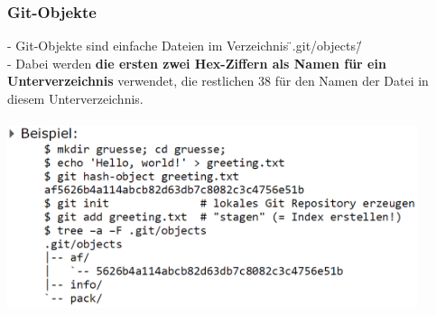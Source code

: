 \subsubsection{Git-Objekte}
- Git-Objekte sind einfache Dateien im Verzeichnis \"{}.git/objects/\"{}\\
- Dabei werden \textbf{die ersten zwei Hex-Ziffern als Namen für ein Unterverzeichnis} verwendet, die restlichen 38 für den Namen der Datei in diesem Unterverzeichnis.\\\\
\includegraphics[width = 12cm]{images/gitobjekte}\\

